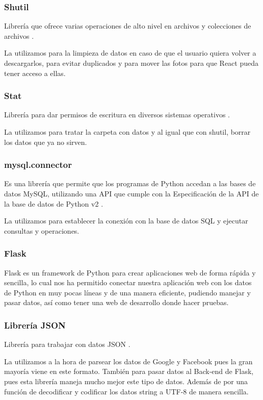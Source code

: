  		 \subsubsection*{Shutil} 
 		 	Librería que ofrece varias operaciones de alto nivel en archivos y colecciones de archivos  \citep{shutil}.
 		 
 		  	La utilizamos para la limpieza de datos en caso de que el usuario quiera volver a descargarlos, para evitar duplicados y para mover las fotos para que React pueda tener acceso a ellas. 
 		 
 		 \subsubsection*{Stat}
 		 	Librería para dar permisos de escritura en diversos sistemas operativos \citep{stat}.
 		 
 		  	La utilizamos para tratar la carpeta con datos y al igual que con shutil, borrar los datos que ya no sirven. 
 		  	
 		 \subsubsection*{mysql.connector} 
 		 	Es una librería que permite que los programas de Python accedan a las bases de datos MySQL, utilizando una API que cumple con la Especificación de la API de la base de datos de Python v2 \citep{MySQLConnector}.
 		 
 			La utilizamos para establecer la conexión con la base de datos SQL y ejecutar consultas y operaciones.
 			
 		 					
 		 \subsubsection*{Flask}
 		 Flask es un framework de Python para crear aplicaciones web de forma rápida y sencilla, lo cual nos ha permitido conectar nuestra aplicación web con los datos de Python en muy pocas líneas y de una manera eficiente, pudiendo manejar y pasar datos, así como tener una web de desarrollo donde hacer pruebas.
 		 	
 		 
 		 \subsubsection*{Librería JSON} 
 		 	Librería para trabajar con datos JSON \cite{JsonPython}. 
 		 
 		 	La utilizamos a la hora de parsear los datos de Google y Facebook pues la gran mayoría viene en este formato. También para pasar datos al Back-end de Flask, pues esta librería maneja mucho mejor este tipo de datos. Además de por una función de decodificar y codificar los datos string a UTF-8 de manera sencilla.
 		 	
